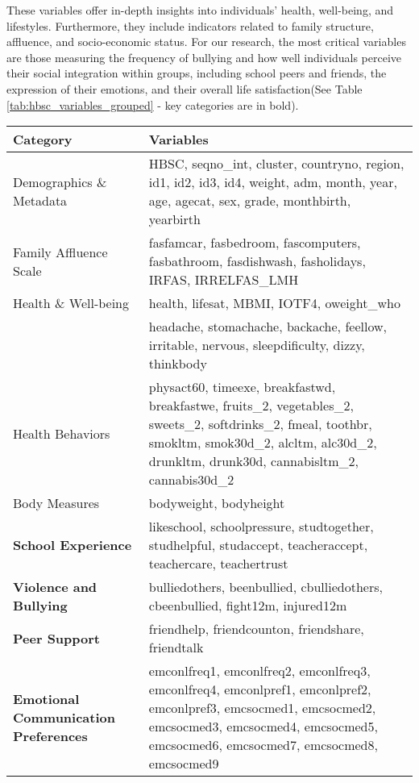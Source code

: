 \documentclass[main.tex]{subfiles}
\begin{document}
These variables offer in-depth insights into individuals' health, well-being, and lifestyles. Furthermore, they include indicators related to family structure, affluence, and socio-economic status. For our research, the most critical variables are those measuring the frequency of bullying and how well individuals perceive their social integration within groups, including school peers and friends, the expression of their emotions, and their overall life satisfaction(See Table \ref{tab:hbsc_variables_grouped}  - key categories are in bold).
\begin{table}[!ht]
  \centering
  \begin{tabular}{|p{40mm}|p{100mm}|}
  \toprule
  \textbf{Category}&\textbf{Variables}\\
  \toprule
    Demographics \& Metadata & HBSC, seqno\_int, cluster, countryno, region, id1, id2, id3, id4, weight, adm, month, year, age, agecat, sex, grade, monthbirth, yearbirth \\ \hline
    Family Affluence Scale & fasfamcar, fasbedroom, fascomputers, fasbathroom, fasdishwash, fasholidays, IRFAS, IRRELFAS\_LMH \\ \hline
    Health \& Well-being & health, lifesat, MBMI, IOTF4, oweight\_who \\ \hline
    & headache, stomachache, backache, feellow, irritable, nervous, sleepdificulty, dizzy, thinkbody \\ \hline
    Health Behaviors & physact60, timeexe, breakfastwd, breakfastwe, fruits\_2, vegetables\_2, sweets\_2, softdrinks\_2, fmeal, toothbr, smokltm, smok30d\_2, alcltm, alc30d\_2, drunkltm, drunk30d, cannabisltm\_2, cannabis30d\_2 \\ \hline
    Body Measures & bodyweight, bodyheight \\ \hline
    \textbf{School Experience }& likeschool, schoolpressure, studtogether, studhelpful, studaccept, teacheraccept, teachercare, teachertrust \\ \hline
    \textbf{Violence and Bullying} & bulliedothers, beenbullied, cbulliedothers, cbeenbullied, fight12m, injured12m \\ \hline
    \textbf{Peer Support} & friendhelp, friendcounton, friendshare, friendtalk \\ \hline
    \textbf{Emotional Communication Preferences} & emconlfreq1, emconlfreq2, emconlfreq3, emconlfreq4, emconlpref1, emconlpref2, emconlpref3, emcsocmed1, emcsocmed2, emcsocmed3, emcsocmed4, emcsocmed5, emcsocmed6, emcsocmed7, emcsocmed8, emcsocmed9 \\ \hline

\end{tabular}
\end{table}
\end{document}
